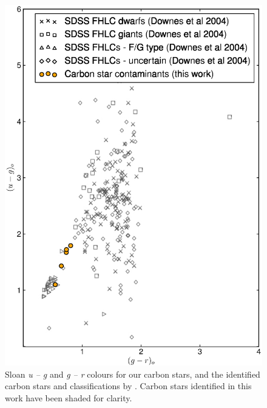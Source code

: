 \documentclass[preprint2]{aastex}
\begin{document}
\begin{figure}[h!]
	\includegraphics[width=\columnwidth]{./figures/carbonstarcolor.eps}
	\caption{Sloan \textit{u \--- g} and \textit{g \--- r} colours for our carbon stars, and the identified carbon stars and classifications by \citet{Downes;et-al_2004}. Carbon stars identified in this work have been shaded for clarity.}
	\label{fig:carbon-sdss}
\end{figure}

\end{document}
